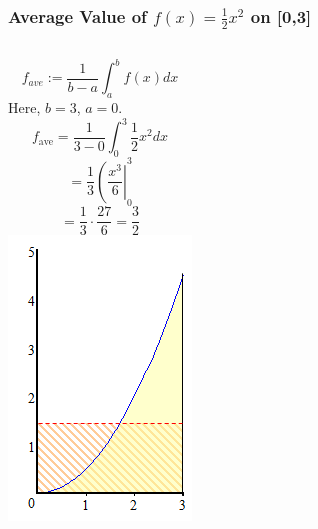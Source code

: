 \begin{frame}

\frametitle{Average Value of $f(x)=\frac{1}{2}x^2$ on [0,3]}

\begin{columns}[c]
\[
f_{ave}:=\dfrac{1}{b-a} \int_a^b f(x) dx
\]
Here, $ b= $\pause $ 3 $, $ a= 0$. \pause 
 \[
 f_{\textrm{ave}}=\frac{1}{3-0}\int_0^3\frac{1}{2}x^2 dx
\]
\pause 
 \[
 =\frac{1}{3}\left(\frac{x^3}{6}\right|_0^3
\]
\pause
\[
   =\frac{1}{3}\cdot\frac{27}{6}=\frac32
 \]
 \pause 
{\includegraphics[width=.8\textwidth]{average-value/pictures/ex1}}
\end{columns}
\end{frame}

